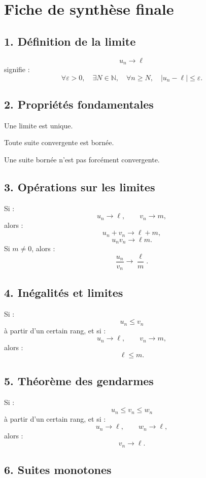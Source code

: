 \documentclass[11pt,a4paper]{article}
\newcommand{\N}{\mathbb N}
\newcommand{\abs}[1]{\left|#1\right|}
\begin{document}
\newpage
\section{Fiche de synthèse finale}

\subsection*{1. Définition de la limite}

\[
u_n\to\ell
\]
signifie :
\[
\forall \varepsilon>0,\quad \exists N\in\N,\quad \forall n\geq N,\quad \abs{u_n-\ell}\leq\varepsilon.
\]

\subsection*{2. Propriétés fondamentales}

Une limite est unique.

Toute suite convergente est bornée.

Une suite bornée n'est pas forcément convergente.

\subsection*{3. Opérations sur les limites}

Si :
\[
u_n\to\ell,
\qquad
v_n\to m,
\]
alors :
\[
u_n+v_n\to\ell+m,
\]
\[
u_nv_n\to\ell m.
\]
Si \(m\neq0\), alors :
\[
\frac{u_n}{v_n}\to\frac{\ell}{m}.
\]

\subsection*{4. Inégalités et limites}

Si :
\[
u_n\leq v_n
\]
à partir d'un certain rang, et si :
\[
u_n\to\ell,
\qquad
v_n\to m,
\]
alors :
\[
\ell\leq m.
\]

\subsection*{5. Théorème des gendarmes}

Si :
\[
u_n\leq v_n\leq w_n
\]
à partir d'un certain rang, et si :
\[
u_n\to\ell,
\qquad
w_n\to\ell,
\]
alors :
\[
v_n\to\ell.
\]

\subsection*{6. Suites monotones}
\end{document}
